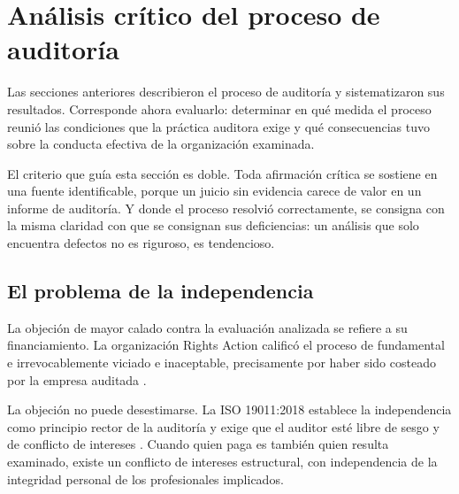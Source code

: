 %
%

\section{Análisis crítico del proceso de auditoría}
\label{sec:critico}

Las secciones anteriores describieron el proceso de auditoría y sistematizaron sus
resultados. Corresponde ahora evaluarlo: determinar en qué medida el proceso
reunió las condiciones que la práctica auditora exige y qué consecuencias tuvo
sobre la conducta efectiva de la organización examinada.

El criterio que guía esta sección es doble. Toda afirmación crítica se sostiene en
una fuente identificable, porque un juicio sin evidencia carece de valor en un
informe de auditoría. Y donde el proceso resolvió correctamente, se consigna con
la misma claridad con que se consignan sus deficiencias: un análisis que solo
encuentra defectos no es riguroso, es tendencioso.

\subsection{El problema de la independencia}

La objeción de mayor calado contra la evaluación analizada se refiere a su
financiamiento. La organización Rights Action calificó el proceso de fundamental e
irrevocablemente viciado e inaceptable, precisamente por haber sido costeado por
la empresa auditada \parencite{rightsactionsfcritica}.

La objeción no puede desestimarse. La ISO 19011:2018 establece la independencia
como principio rector de la auditoría y exige que el auditor esté libre de sesgo y
de conflicto de intereses \parencite{iso2018iso19011}. Cuando quien paga es
también quien resulta examinado, existe un conflicto de intereses estructural, con
independencia de la integridad personal de los profesionales implicados.

